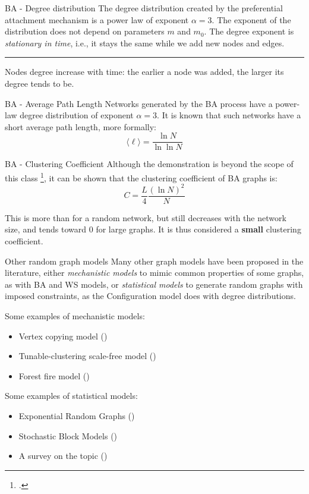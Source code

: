 \begin{textbox}{BA - Degree distribution }
    The degree distribution created by the preferential attachment mechanism is a power law of exponent $ \alpha=3$. The exponent of the distribution does not depend on parameters $m$ and $m_0$. The degree exponent is \textit{stationary in time}, i.e., it stays the same while we add new nodes and edges.

    \noindent\rule{4cm}{0.1pt}

    Nodes degree increase with time: the earlier a node was added, the larger its degree tends to be. %
\end{textbox}


\begin{textbox}{BA - Average Path Length }
    Networks generated by the BA process have a power-law degree distribution of exponent $ \alpha=3$. It is known that such networks have a short average path length, more formally:
    \[
        \langle \ell \rangle=\frac{\ln N}{\ln \ln N}
    \]
\end{textbox}


\begin{textbox}{BA - Clustering Coefficient }
    Although the demonstration is beyond the scope of this class \footcite{barabasi1999emergence}, it can be shown that the clustering coefficient of BA graphs is:
    \[
        C=\frac{L}{4}\frac{(\ln N)^2}{N}
    \]

    This is more than for a random network, but still decreases with the network size, and tends toward 0 for large graphs. It is thus considered a \textbf{small} clustering coefficient.
\end{textbox}

\begin{textbox}{Other random graph models }
    Many other graph models have been proposed in the literature, either \textit{mechanistic models} to mimic common properties of some graphs, as with BA and WS models, or \textit{statistical models} to generate random graphs with imposed constraints, as the Configuration model does with degree distributions.

    Some examples of mechanistic models:
    \begin{itemize}
        \item Vertex copying model (\cite{kleinberg1999web})
        \item Tunable-clustering scale-free model (\cite{holme2002growing})
        \item Forest fire model (\cite{leskovec2005graphs})
    \end{itemize}

    Some examples of statistical models:
    \begin{itemize}
        \item Exponential Random Graphs (\cite{robins2007introduction})
        \item Stochastic Block Models (\cite{peixoto2019bayesian})
        \item A survey on the topic (\cite{orbanz2014bayesian})
    \end{itemize}
\end{textbox}

